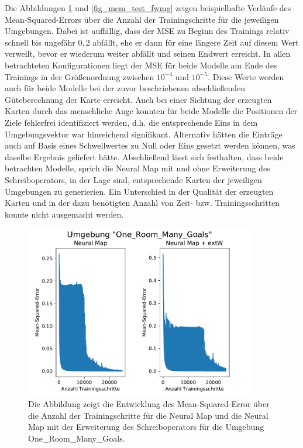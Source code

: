 Die Abbildungen \ref{fig_mem_test_ormg} und \ref{fig_mem_test_fwmg} zeigen beispielhafte Verläufe des Mean-Squared-Errors über die Anzahl der Trainingschritte für die jeweiligen Umgebungen. Dabei ist auffällig, dass der MSE zu Beginn des Trainings relativ schnell bis ungefähr $0,2$ abfällt, ehe er dann für eine längere Zeit auf diesem Wert verweilt, bevor er wiederum weiter abfällt und seinen Endwert erreicht. In allen betrachteten Konfigurationen liegt der MSE für beide Modelle am Ende des Trainings in der Größenordnung zwischen $10^{-4}$ und $10^{-5}$. Diese Werte werden auch für beide Modelle bei der zuvor beschriebenen abschließenden Güteberechnung der Karte erreicht. Auch bei einer Sichtung der erzeugten Karten durch das menschliche Auge konnten für beide Modelle die Positionen der Ziele fehlerfrei identifiziert werden, d.h. die entsprechende Eins in dem Umgebungsvektor war hinreichend signifikant. Alternativ hätten die Einträge auch auf Basis eines Schwellwertes zu Null oder Eins gesetzt werden können, was daselbe Ergebnis geliefert hätte. Abschließend lässt sich festhalten, dass beide betrachten Modelle, sprich die Neural Map mit und ohne Erweiterung des Schreiboperators, in der Lage sind, entsprechende Karten der jeweiligen Umgebungen zu generierien. Ein Unterschied in der Qualität der erzeugten Karten und in der dazu benötigten Anzahl von Zeit- bzw. Trainingsschritten konnte nicht ausgemacht werden.


\begin{figure}[ht!]
  \centering
  \includegraphics[height=0.575\textwidth, width=0.9\textwidth]{abbildungen/mem_test_ormg.pdf}
  \caption{Die Abbildung zeigt die Entwicklung des Mean-Squared-Error über die Anzahl der Trainingschritte für die Neural Map und die Neural Map mit der Erweiterung des Schreiboperators für die Umgebung \glqq One\_Room\_Many\_Goals\grqq{}.}
  \label{fig_mem_test_ormg}
\end{figure}

